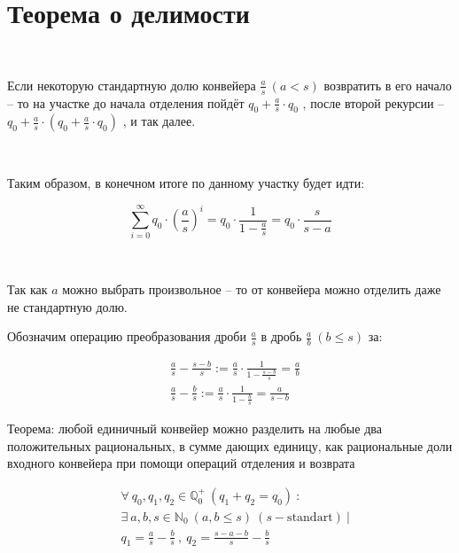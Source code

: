 \vspace{0.5in}

\section{Теорема о делимости}

\

Если некоторую стандартную долю конвейера $\frac{a}{s} \ (a < s)$ возвратить в его начало -- то на участке до начала отделения пойдёт $q_0 + \frac{a}{s}\cdot q_0$ , после второй рекурсии -- $q_0 + \frac{a}{s}\cdot \left( q_0 + \frac{a}{s}\cdot q_0 \right)$ , и так далее.

\

\noindent Таким образом, в конечном итоге по данному участку будет идти:

$$\sum_{i=0}^{\infty} q_0 \cdot \left( \frac{a}{s} \right)^i = q_0 \cdot \frac{1}{1-\frac{a}{s}} = q_0\cdot\frac{s}{s-a}$$

\

Так как $a$ можно выбрать произвольное -- то от конвейера можно отделить даже не стандартную долю.

\vspace{0.3in}

\noindent Обозначим операцию преобразования дроби $\frac{a}{s}$ в дробь $\frac{a}{b} \ (b \le s)$ за:

\begin{align*}
	&\frac{a}{s} - \frac{s-b}{s} := \frac{a}{s} \cdot \frac{1}{1 - \frac{s-b}{s}} = \frac{a}{b} \\	
	&\frac{a}{s} - \frac{b}{s} := \frac{a}{s} \cdot \frac{1}{1 - \frac{b}{s}} = \frac{a}{s-b}
\end{align*}

\vspace{0.3in}

Теорема: любой единичный конвейер можно разделить на любые два положительных рациональных, в сумме дающих единицу, как рациональные доли входного конвейера при помощи операций отделения и возврата

\begin{align*}
	&\forall \ q_0, q_1, q_2 \in \mathbb{Q}^+_0 \ (q_1 + q_2 = q_0) \ : \\
	&\exists \ a, b, s \in \mathbb{N}_0 \ (a, b \le s) \ (s - \text{standart}) \ | \\
	&q_1 = \frac{a}{s} - \frac{b}{s} \ , \ q_2 = \frac{s-a-b}{s} - \frac{b}{s}
\end{align*}












